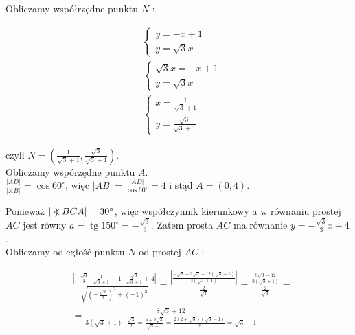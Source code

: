 \documentclass[10pt]{article}
\newcommand\Varangle{\mathop{{<\!\!\!\!\!\text{\small)}}\:}\nolimits}
\begin{document}
Obliczamy współrzędne punktu $N$ :

$$
\begin{aligned}
& \left\{\begin{array}{l}
y=-x+1 \\
y=\sqrt{3} x
\end{array}\right. \\
& \left\{\begin{array}{l}
\sqrt{3} x=-x+1 \\
y=\sqrt{3} x
\end{array}\right. \\
& \left\{\begin{array}{l}
x=\frac{1}{\sqrt{3}+1} \\
y=\frac{\sqrt{3}}{\sqrt{3}+1}
\end{array}\right.
\end{aligned}
$$

czyli $N=\left(\frac{1}{\sqrt{3}+1}, \frac{\sqrt{3}}{\sqrt{3}+1}\right)$.\\
Obliczamy wspórzędne punktu $A$.\\
$\frac{|A D|}{|A B|}=\cos 60^{\circ}$, więc $|A B|=\frac{|A D|}{\cos 60^{\circ}}=4$ i stąd $A=(0,4)$.

Ponieważ $|\Varangle B C A|=30^{\circ}$, więc współczynnik kierunkowy a w równaniu prostej $A C$ jest równy $a=\operatorname{tg} 150^{\circ}=-\frac{\sqrt{3}}{3}$. Zatem prosta $A C$ ma równanie $y=-\frac{\sqrt{3}}{3} x+4$.\\
Obliczamy odległość punktu $N$ od prostej $A C$ :

$$
\begin{aligned}
& \frac{\left|-\frac{\sqrt{3}}{3} \cdot \frac{1}{\sqrt{3}+1}-1 \cdot \frac{\sqrt{3}}{\sqrt{3}+1}+4\right|}{\sqrt{\left(-\frac{\sqrt{3}}{3}\right)^{2}+(-1)^{2}}}=\frac{\left|\frac{-\sqrt{3}-3 \sqrt{3}+12(\sqrt{3}+1)}{3(\sqrt{3}+1)}\right|}{\frac{2}{\sqrt{3}}}=\frac{\frac{8 \sqrt{3}+12}{3(\sqrt{3}+1)}}{\frac{2}{\sqrt{3}}}= \\
& =\frac{8 \sqrt{3}+12}{3(\sqrt{3}+1) \cdot \frac{\sqrt{3}}{2}=\frac{4+2 \sqrt{3}}{\sqrt{3}+1}=\frac{2(2+\sqrt{3})(\sqrt{3}-1)}{2}=\sqrt{3}+1}
\end{aligned}
$$
\end{document}
